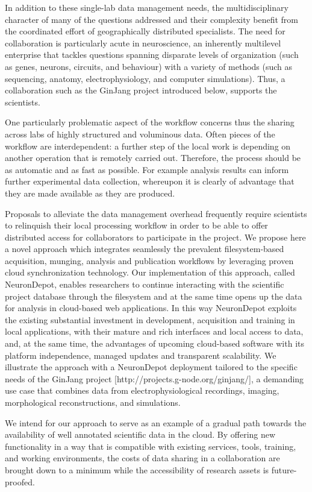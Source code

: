 \documentclass{frontiersSCNS} %
\begin{document}
In addition to these single-lab data management needs, the multidisciplinary
character of many of the questions addressed and their complexity benefit from
the coordinated effort of geographically distributed specialists. The need for
collaboration is particularly acute in neuroscience, an inherently multilevel
enterprise that tackles questions spanning disparate levels of organization
(such as genes, neurons, circuits, and behaviour) with a variety of methods
(such as sequencing, anatomy, electrophysiology, and computer simulations).
Thus, a collaboration such as the GinJang project introduced below, supports
the scientists.

One particularly problematic aspect of the workflow concerns thus the sharing
across labs of highly structured and voluminous data. Often pieces of the
workflow are interdependent: a further step of the local work is depending on
another operation that is remotely carried out. Therefore, the process should
be as automatic and as fast as possible. For example analysis results can
inform further experimental data collection, whereupon it is clearly of
advantage that they are made available as they are produced.

Proposals to alleviate the data management overhead frequently require
scientists to relinquish their local processing workflow in order to be able to
offer distributed access for collaborators to participate in the project. We
propose here a novel approach which integrates seamlessly the prevalent
filesystem-based acquisition, munging, analysis and publication workflows by
leveraging proven cloud synchronization technology. Our implementation of this
approach, called NeuronDepot, enables researchers to continue interacting with
the scientific project database through the filesystem and at the same time
opens up the data for analysis in cloud-based web applications. In this way
NeuronDepot exploits the existing substantial investment in development,
acquisition and training in local applications, with their mature and rich
interfaces and local access to data, and, at the same time, the advantages of
upcoming cloud-based software with its platform independence, managed updates
and transparent scalability. We illustrate the approach with a NeuronDepot
deployment tailored to the specific needs of the GinJang project
[http://projects.g-node.org/ginjang/], a demanding use case that combines data
from electrophysiological recordings, imaging, morphological reconstructions,
and simulations.

We intend for our approach to serve as an example of a gradual path towards the
availability of well annotated scientific data in the cloud. By offering new
functionality in a way that is compatible with existing services, tools,
training, and working environments, the costs of data sharing in a
collaboration are brought down to a minimum while the accessibility of research
assets is future-proofed.
\end{document}
